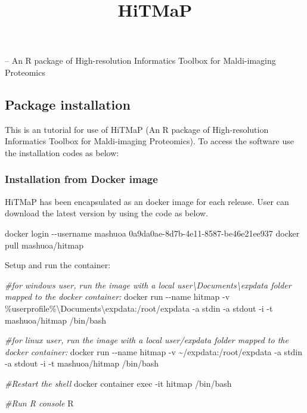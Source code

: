 \documentclass[
]{article}
\title{HiTMaP}
\author{}
\date{\vspace{-2.5em}}
\newenvironment{Shaded}{\begin{snugshade}}{\end{snugshade}}
\newcommand{\CommentTok}[1]{\textcolor[rgb]{0.56,0.35,0.01}{\textit{#1}}}
\newcommand{\ExtensionTok}[1]{#1}
\newcommand{\NormalTok}[1]{#1}
\begin{document}
\maketitle

-- An R package of High-resolution Informatics Toolbox for Maldi-imaging
Proteomics

\hypertarget{package-installation}{%
\subsection{Package installation}\label{package-installation}}

This is an tutorial for use of HiTMaP (An R package of High-resolution
Informatics Toolbox for Maldi-imaging Proteomics). To access the
software use the installation codes as below:

\hypertarget{installation-from-docker-image}{%
\subsubsection{Installation from Docker
image}\label{installation-from-docker-image}}

HiTMaP has been encapsulated as an docker image for each release. User
can download the latest version by using the code as below.

\begin{Shaded}
\begin{Highlighting}[]
\ExtensionTok{docker}\NormalTok{ login {-}{-}username mashuoa}
\ExtensionTok{0a9da0ae{-}8d7b{-}4e11{-}8587{-}be46e21ee937}
\ExtensionTok{docker}\NormalTok{ pull mashuoa/hitmap}
\end{Highlighting}
\end{Shaded}

Setup and run the container:

\begin{Shaded}
\begin{Highlighting}[]
\CommentTok{\#for windows user, run the image with a local user\textbackslash{}Documents\textbackslash{}expdata folder mapped to the docker container:}
\ExtensionTok{docker}\NormalTok{ run {-}{-}name hitmap {-}v \%userprofile\%\textbackslash{}Documents\textbackslash{}expdata:/root/expdata {-}a stdin {-}a stdout {-}i {-}t mashuoa/hitmap /bin/bash }

\CommentTok{\#for linux user, run the image with a local user/expdata folder mapped to the docker container:}
\ExtensionTok{docker}\NormalTok{ run {-}{-}name hitmap {-}v \textasciitilde{}/expdata:/root/expdata {-}a stdin {-}a stdout {-}i {-}t mashuoa/hitmap /bin/bash }

\CommentTok{\#Restart the shell }
\ExtensionTok{docker}\NormalTok{ container exec {-}it hitmap /bin/bash}

\CommentTok{\#Run R console}
\ExtensionTok{R}
\end{Highlighting}
\end{Shaded}
\end{document}
